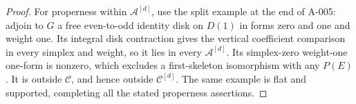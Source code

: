 \begin{proof}
For properness within $\mathcal A^{[d]}$, use the split
example at the end of A-005: adjoin to $G$ a free even-to-odd
identity disk on $D(1)$ in forms zero and one and weight one.
Its integral disk contraction gives the vertical coefficient
comparison in every simplex and weight, so it lies in every
$\mathcal A^{[d]}$.  Its simplex-zero weight-one one-form
is nonzero, which excludes a first-skeleton isomorphism with
any $P(E)$.  It is outside $\mathcal C$, and hence outside
$\mathcal C^{[d]}$.  The same example is flat and supported,
completing all the stated properness assertions.
\end{proof}
